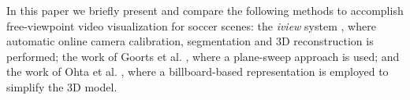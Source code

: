 
In this paper we briefly present and compare the following methods to accomplish free-viewpoint video 
visualization for soccer scenes: the \textit{iview} system \cite{02_iview}, where automatic online camera calibration, 
segmentation and 3D reconstruction is performed;
the work of Goorts et al. \cite{05_plane_sweeping}, where a plane-sweep approach is used; 
and the work of Ohta et al. \cite{03_billboard}, where a billboard-based representation is employed to simplify the 3D model.


